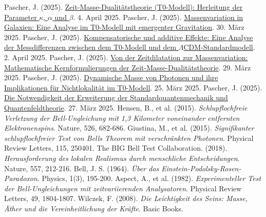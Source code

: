 \documentclass[a4paper,12pt]{article}
\theoremstyle{definition}
\theoremstyle{remark}
\begin{document}
	\begin{thebibliography}{99}
		 Pascher, J. (2025). \href{https://github.com/jpascher/T0-Time-Mass-Duality/tree/main/2/pdf/Deutsch/ZeitMasseT0Params.pdf}{Zeit-Masse-Dualitätstheorie (T0-Modell): Herleitung der Parameter \(\kappa\), \(\alpha\) und \(\beta\)}. 4. April 2025.
		 Pascher, J. (2025). \href{https://github.com/jpascher/T0-Time-Mass-Duality/tree/main/2/pdf/Deutsch/MassVarGalaxien.pdf}{Massenvariation in Galaxien: Eine Analyse im T0-Modell mit emergenter Gravitation}. 30. März 2025.
		 Pascher, J. (2025). \href{https://github.com/jpascher/T0-Time-Mass-Duality/tree/main/2/pdf/Deutsch/MessdifferenzenT0Standard.pdf}{Kompensatorische und additive Effekte: Eine Analyse der Messdifferenzen zwischen dem T0-Modell und dem \(\Lambda\)CDM-Standardmodell}. 2. April 2025.
		 Pascher, J. (2025). \href{https://github.com/jpascher/T0-Time-Mass-Duality/tree/main/2/pdf/Deutsch/MathZeitMasseLagrange.pdf}{Von der Zeitdilatation zur Massenvariation: Mathematische Kernformulierungen der Zeit-Masse-Dualitätstheorie}. 29. März 2025.
		 Pascher, J. (2025). \href{https://github.com/jpascher/T0-Time-Mass-Duality/tree/main/2/pdf/Deutsch/DynMassePhotonenNichtlokal.pdf}{Dynamische Masse von Photonen und ihre Implikationen für Nichtlokalität im T0-Modell}. 25. März 2025.
		 Pascher, J. (2025). \href{https://github.com/jpascher/T0-Time-Mass-Duality/tree/main/2/pdf/Deutsch/NotwendigkeitQMErweiterung.pdf}{Die Notwendigkeit der Erweiterung der Standardquantenmechanik und Quantenfeldtheorie}. 27. März 2025.
		 Hensen, B., et al. (2015). \textit{Schlupflochfreie Verletzung der Bell-Ungleichung mit 1,3 Kilometer voneinander entfernten Elektronenspins}. Nature, 526, 682-686.
		 Giustina, M., et al. (2015). \textit{Signifikanter schlupflochfreier Test von Bells Theorem mit verschränkten Photonen}. Physical Review Letters, 115, 250401.
		 The BIG Bell Test Collaboration. (2018). \textit{Herausforderung des lokalen Realismus durch menschliche Entscheidungen}. Nature, 557, 212-216.
		 Bell, J. S. (1964). \textit{Über das Einstein-Podolsky-Rosen-Paradoxon}. Physics, 1(3), 195-200.
		 Aspect, A., et al. (1982). \textit{Experimenteller Test der Bell-Ungleichungen mit zeitvariierenden Analysatoren}. Physical Review Letters, 49, 1804-1807.
		 Wilczek, F. (2008). \textit{Die Leichtigkeit des Seins: Masse, Äther und die Vereinheitlichung der Kräfte}. Basic Books.

\end{thebibliography}
\end{document}
